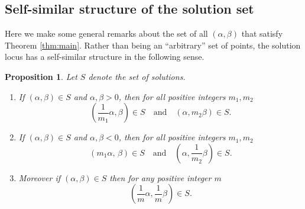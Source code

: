 \documentclass[12pt,letterpaper, reqno]{amsart}
\newtheorem{prop}[thm]{Proposition}
\theoremstyle{definition}
\theoremstyle{remark}
\begin{document}
\subsection{Self-similar structure of the solution set}\label{sec:23}
Here we make some general remarks about the set of all $(\alpha,\beta)$ that satisfy Theorem \ref{thm:main}. 
Rather than being an ``arbitrary'' set of points, the solution locus has  a self-similar structure in the following sense.

\begin{prop}\label{prop:26} 
 Let $S$ denote the set of solutions.
\begin{enumerate}
\item[(1)]
 If $(\alpha,\beta) \in S$ and $\alpha,\beta>0$, then for  all positive integers $m_1, m_2$
\[ (\frac{1}{m_1} \alpha, \beta)\in S 
\quad\text{and}\quad ( \alpha, m_2\beta)\in S.
\]

\item[(2)]
 If $(\alpha,\beta)\in S$ and $\alpha,\beta<0$, then for all positive integers $m_1, m_2$
\[ 
(m_1 \alpha,\,  \beta)\in S 
\quad\text{and}\quad (\alpha,\frac{1}{m_2}\beta)\in S.
\]

\item[(3)]
Moreover if $(\alpha,\beta)\in S$ then for any positive integer $m$
\[ (\frac1m\alpha, \frac1m\beta) \in S.\]

\end{enumerate}
\end{prop}
\end{document}
